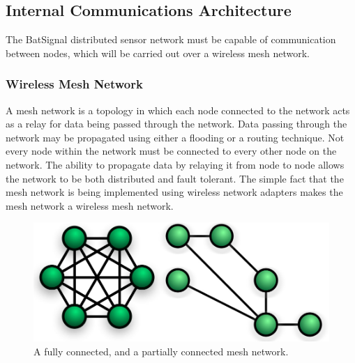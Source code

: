 \documentclass[11pt,a4paper]{article}
\begin{document}
\subsection{Internal Communications Architecture}
The BatSignal distributed sensor network must be capable of communication between nodes, which will be carried out over a wireless mesh network. 

\subsubsection{Wireless Mesh Network}
A mesh network is a topology in which each node connected to the network acts as a relay for data being passed through the network. Data passing through the network may be propagated using either a flooding or a routing technique. Not every node within the network must be connected to every other node on the network. The ability to propagate data by relaying it from node to node allows the network to be both distributed and fault tolerant. The simple fact that the mesh network is being implemented using wireless network adapters makes the mesh network a wireless mesh network. 
\begin{figure}[H]
	\centering
		\includegraphics[width=\textwidth, keepaspectratio=true]{Graphics/mesh-networks.jpg}
	\caption{A fully connected, and a partially connected mesh network.}
\end{figure}
\end{document}

